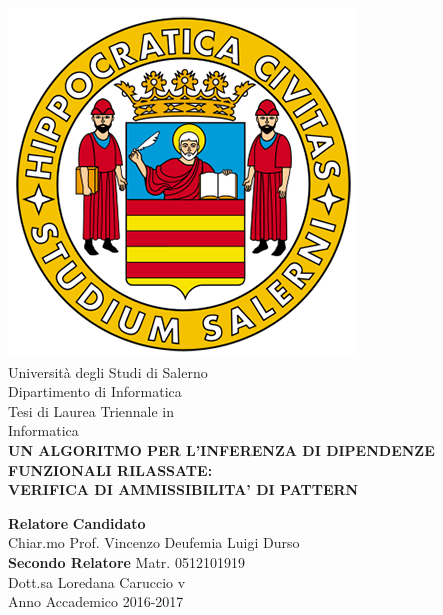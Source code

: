 \begin{center}
    \includegraphics[scale = 0.3]{Immagini/logoUnisa.png}\\
    \vspace{1cm}
    {\Large Università degli Studi di Salerno}\\[0.2truecm]
    {\large Dipartimento di Informatica}\\
    \hrulefill
    \vfill
    {\large Tesi di Laurea Triennale in }\\[0.2truecm]
    {\Large Informatica}\\
    \vfill
    {\large \bf UN ALGORITMO PER L'INFERENZA DI DIPENDENZE FUNZIONALI RILASSATE:}\\
    \vspace{0,5cm}
    {\large \bf VERIFICA DI AMMISSIBILITA' DI PATTERN}
    \vfill\vfill\vfill
    
    
    {\bf Relatore} \hfill {\bf Candidato} \\
    Chiar.mo Prof. Vincenzo Deufemia \hfill Luigi Durso \\
    {\bf Secondo Relatore}
    \hfill Matr. 0512101919\\
    
    
    Dott.sa Loredana Caruccio  \hfill {\phantom v} \\
    \vspace{1cm}
    \hrulefill 
    \vfill
    Anno Accademico 2016-2017
\end{center}